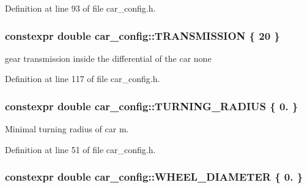 Definition at line 93 of file car\+\_\+config.\+h.

\subsubsection[{\texorpdfstring{T\+R\+A\+N\+S\+M\+I\+S\+S\+I\+ON}{TRANSMISSION}}]{\setlength{\rightskip}{0pt plus 5cm}constexpr double car\+\_\+config\+::\+T\+R\+A\+N\+S\+M\+I\+S\+S\+I\+ON \{ 20 \}}\hypertarget{namespacecar__config_a7af97a6c9168673aba8917029cfe44d3}{}\label{namespacecar__config_a7af97a6c9168673aba8917029cfe44d3}


gear transmission inside the differential of the car  none 



Definition at line 117 of file car\+\_\+config.\+h.

\subsubsection[{\texorpdfstring{T\+U\+R\+N\+I\+N\+G\+\_\+\+R\+A\+D\+I\+US}{TURNING_RADIUS}}]{\setlength{\rightskip}{0pt plus 5cm}constexpr double car\+\_\+config\+::\+T\+U\+R\+N\+I\+N\+G\+\_\+\+R\+A\+D\+I\+US \{ 0. \}}\hypertarget{namespacecar__config_afe308ba7ae07f7bd5af7e79a095101a9}{}\label{namespacecar__config_afe308ba7ae07f7bd5af7e79a095101a9}


Minimal turning radius of car  m. 



Definition at line 51 of file car\+\_\+config.\+h.

\subsubsection[{\texorpdfstring{W\+H\+E\+E\+L\+\_\+\+D\+I\+A\+M\+E\+T\+ER}{WHEEL_DIAMETER}}]{\setlength{\rightskip}{0pt plus 5cm}constexpr double car\+\_\+config\+::\+W\+H\+E\+E\+L\+\_\+\+D\+I\+A\+M\+E\+T\+ER \{ 0. \}}\hypertarget{namespacecar__config_a6f064e331d6d85d46028dfbe75f063dd}{}\label{namespacecar__config_a6f064e331d6d85d46028dfbe75f063dd}


